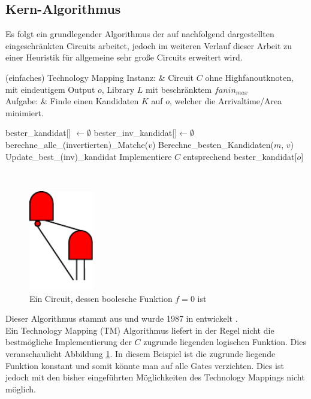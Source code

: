 \documentclass[11pt, a4paper, german]{article}
\newcommand{\TM}{Technology  Mapping }
\begin{document}
\subsection{Kern-Algorithmus}
\label{subsec:kern_algorithmus}

Es folgt ein grundlegender Algorithmus der auf nachfolgend dargestellten eingeschränkten Circuits arbeitet, jedoch im weiteren Verlauf dieser Arbeit zu einer Heuristik für allgemeine sehr große Circuits erweitert wird.

\begin{problem}[framed]{(einfaches) Technology Mapping}
  Instanz:  & Circuit $C$ ohne Highfanoutknoten, mit eindeutigem Output $o$, Library $L$ mit beschr\"anktem $fanin_{max}$\\
  Aufgabe: &  Finde einen Kandidaten $K$ auf $o$, welcher die Arrivaltime/Area minimiert.
\end{problem}

\begin{algorithm}[H]
 \LinesNumbered
 \DontPrintSemicolon
 \caption{(einfaches) Technology Mapping}

 bester\_kandidat[] $\gets \emptyset$\;
 bester\_inv\_kandidat[]$ \gets \emptyset$\;
 {
   berechne\_alle\_(invertierten)\_Matche($v$)\;
   {
      Berechne\_besten\_Kandidaten($m$, $v$)\;
      Update\_best\_(inv)\_kandidat\;
   }
 }
 Implementiere $C$ entsprechend bester\_kandidat[$o$]\;
\end{algorithm}\ \\
\begin{figure}
		\includegraphics[width = 2.8cm]{pictures/compiled/compl_redundant}
		\caption{Ein Circuit, dessen boolesche Funktion $f = 0 $ ist}
		\label{bild:compl_redundant}
\end{figure}
Dieser Algorithmus stammt aus \cite{Elbert} und wurde 1987 in \cite{DAGON} entwickelt .\\
Ein \TM (TM) Algorithmus liefert in der Regel nicht die bestmögliche Implementierung der $C$ zugrunde liegenden logischen Funktion. Dies veranschaulicht Abbildung \ref{bild:compl_redundant}. In diesem Beispiel ist die zugrunde liegende Funktion konstant und somit könnte man auf alle Gates verzichten. Dies ist jedoch mit den bisher eingeführten Möglichkeiten des Technology Mappings nicht möglich. \\
\end{document}
